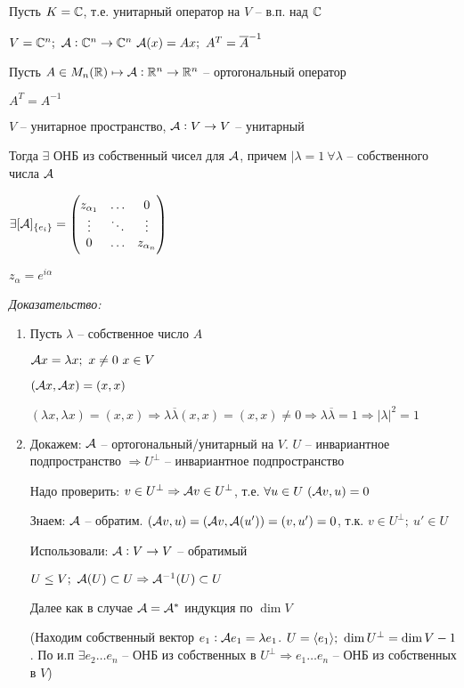 \documentclass[12pt]{article}
\begin{document}
\begin{Remark}{}
    Пусть $K = \mathbb C$, т.е. унитарный оператор на $V$ -- в.п. над $\mathbb C$

    $V = \mathbb C^n;\ \mathcal{A} : \mathbb C^n \to \mathbb C^n\ \mathcal{A}(x) = Ax;\ A^T = \overline{A}^{-1}$

    Пусть $A \in M_n(\mathbb R) \mapsto \mathcal{A} : \mathbb R^n \to \mathbb R^n$ -- ортогональный оператор

    $A^T = A^{-1}$
\end{Remark}

\begin{theo}{}
    $V$ -- унитарное пространство, $\mathcal{A} : V \to V$ -- унитарный 

    Тогда $\exists$ ОНБ из собственный чисел для $\mathcal{A}$, причем $|\lambda = 1\ \forall \lambda$ -- собственного числа $\mathcal{A}$ 

    $\exists [\mathcal{A}]_{\{e_i\}} = \begin{pmatrix}
        z_{\alpha_1} & \ldots & 0 \\
        \vdots & \ddots & \vdots \\
        0 & \ldots & z_{\alpha_n}
    \end{pmatrix}$

    $z_\alpha = e^{i\alpha}$ 
\end{theo}

\textit{Доказательство:}

\begin{enumerate}
    \item Пусть $\lambda$ -- собственное число $A$
    
    $\mathcal{A} x = \lambda x;\ x \neq 0\ x \in V$

    $(\mathcal{A} x, \mathcal{A} x) = (x, x)$

    $(\lambda x, \lambda x) = (x, x) \Rightarrow \lambda \overline{\lambda}(x, x) = (x, x) \neq 0 \Rightarrow \lambda \overline{\lambda} = 1 \Rightarrow |\lambda|^2 = 1$

    \item Докажем: $\mathcal{A}$ -- ортогональный/унитарный на $V$. $U$ -- инвариантное подпространство $\Rightarrow U^\perp$ -- инвариантное подпространство
    
    Надо проверить: $v \in U^\perp \Rightarrow \mathcal{A} v \in U^\perp$, т.е. $\forall u \in U\ (\mathcal{A} v, u) = 0$

    Знаем: $\mathcal{A}$ -- обратим. $(\mathcal{A} v, u) = (\mathcal{A} v, \mathcal{A}(u')) = (v, u') = 0$, т.к. $v \in U^\perp;\ u' \in U$

    \begin{Remark}{}
        Использовали: $\mathcal{A} : V \to V$ -- обратимый 

        $U \leq V;\ \mathcal{A}(U) \subset U \Rightarrow \mathcal{A}^{-1}(U) \subset U$
    \end{Remark}

    Далее как в случае $\mathcal{A} = \mathcal{A}^*$ индукция по $\dim V$

    (Находим собственный вектор $e_1 : \mathcal{A} e_1 = \lambda e_1$. $U = \langle e_1 \rangle;\ \dim U^\perp = \dim V - 1$. По и.п $\exists e_2 \ldots e_n$ -- ОНБ из собственных в $U^\perp \Rightarrow e_1 \ldots e_n$ -- ОНБ из собственных в $V$)
\end{enumerate}
\end{document}
